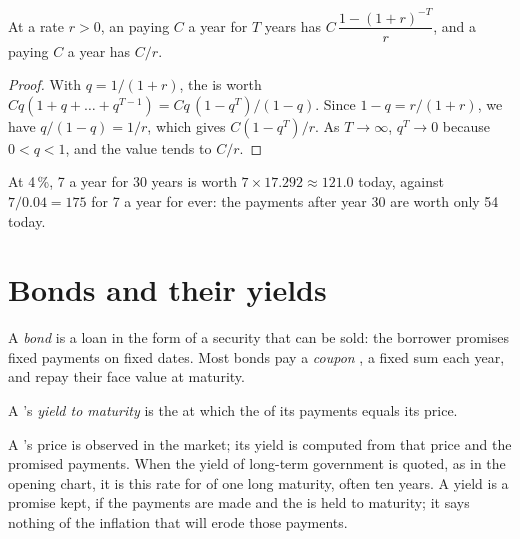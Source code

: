 \begin{proposition}\label{prop:g12:present-value:annuity}
At a rate $r > 0$, an  paying $C$ a year for $T$ years has  $C\,\dfrac{1 - (1 + r)^{-T}}{r}$, and a  paying $C$ a year has 
$C/r$.
\end{proposition}
\begin{proof}
With $q = 1/(1 + r)$, the  is worth $Cq(1 + q + \dots + q^{T-1}) = Cq\,(1 - q^T)/(1 - q)$. Since $1 - q = r/(1 + r)$, we have $q/(1 - q) = 1/r$, which gives
$C(1 - q^T)/r$. As $T \to \infty$, $q^T \to 0$ because $0 < q < 1$, and the value tends to $C/r$.
\end{proof}

At 4\,\%, 7 a year for 30 years is worth $7 \times 17.292 \approx 121.0$ today, against $7/0.04 = 175$ for 7 a year for ever: the payments after year 30 are worth only 54
today.

\section{Bonds and their yields}\label{sec:g12:present-value:bonds}

\begin{definition}\label{def:g12:present-value:bond}
A \emph{bond} is a loan in the form of a security that can be sold: the borrower promises fixed payments on fixed dates. Most bonds pay a \emph{coupon}%
\label{def:g12:present-value:coupon}, a fixed sum each year, and repay their face value at maturity.
\end{definition}

\begin{definition}\label{def:g12:present-value:yield}
A 's \emph{yield to maturity} is the  at which the  of its payments equals its price.
\end{definition}

\begin{measure}
A 's price is observed in the market; its yield is computed from that price and the promised payments. When the yield of long-term government  is quoted, as
in the opening chart, it is this rate for  of one long maturity, often ten years. A yield is a promise kept, if the payments are made and the  is held to maturity;
it says nothing of the inflation that will erode those payments.
\end{measure}

